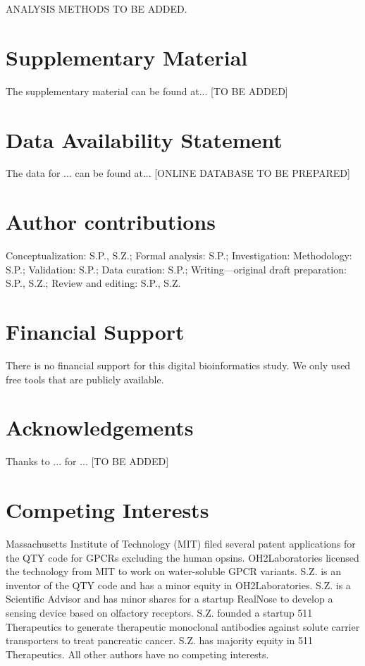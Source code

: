 \documentclass[fleqn,10pt,lineno]{manuscript}
\begin{document}
ANALYSIS METHODS TO BE ADDED.

\section*{Supplementary Material}

The supplementary material can be found at... [TO BE ADDED]

\section*{Data Availability Statement} 

The data for ... can be found at... [ONLINE DATABASE TO BE PREPARED]

\section*{Author contributions}

Conceptualization: S.P., S.Z.; Formal analysis: S.P.; Investigation: Methodology: S.P.; Validation: S.P.; Data curation: S.P.; Writing—original draft preparation: S.P., S.Z.; Review and editing: S.P., S.Z. 

\section*{Financial Support}

There is no financial support for this digital bioinformatics study. We only used free tools that are publicly available. 

\section*{Acknowledgements}

Thanks to ... for ... [TO BE ADDED]


\section*{Competing Interests}

Massachusetts Institute of Technology (MIT) filed several patent applications for the QTY code for GPCRs excluding the human opsins. OH2Laboratories licensed the technology from MIT to work on water-soluble GPCR variants. S.Z. is an inventor of the QTY code and has a minor equity in OH2Laboratories. S.Z. is a Scientific Advisor and has minor shares for a startup RealNose to develop a sensing device based on olfactory receptors. S.Z. founded a startup 511 Therapeutics to generate therapeutic monoclonal antibodies against solute carrier transporters to treat pancreatic cancer. S.Z. has majority equity in 511 Therapeutics. All other authors have no competing interests.
\end{document}

